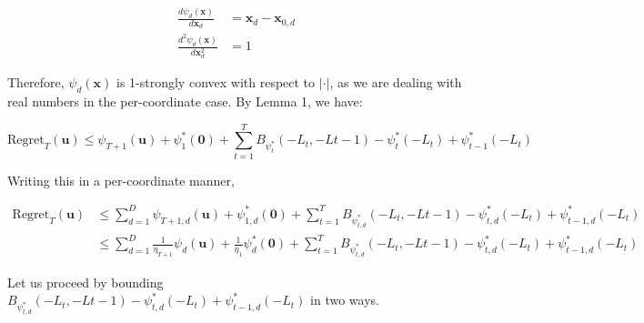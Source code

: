 \documentclass{article}
\newcommand{\Regret}{\text{Regret}}
\newcommand{\bx}{\mathbf{x}}
\newcommand{\bu}{\mathbf{u}}
\begin{document}
\begin{align*}
  \frac{d \psi_d(\bx)}{d \bx_d} &= \bx_d - \bx_{0,d} \\
  \frac{d^2 \psi_d(\bx)}{d \bx_d^2} &= 1
\end{align*}

Therefore, $\psi_d(\bx)$ is 1-strongly convex with respect to $| \cdot |$, as we are dealing with real numbers in the
per-coordinate case. By Lemma 1, we have:

\[
  \Regret_T(\bu) \leq \psi_{T+1}(\bu) + \psi_{1}^* (\textbf{0}) + \sum\limits_{t=1}^T B_{\psi_{t}^*}(-L_t,
  -L{t-1}) - \psi_{t}^* (-L_t) + \psi_{t-1}^*(-L_t)
\]

Writing this in a per-coordinate manner,

\begin{align*}
  \Regret_T(\bu) 
  &\leq \sum\limits_{d=1}^D \psi_{T+1,d}(\bu) + \psi_{1,d}^* (\textbf{0}) + \sum\limits_{t=1}^T
  B_{\psi_{t,d}^*}(-L_t, -L{t-1}) - \psi_{t,d}^* (-L_t) + \psi_{t-1,d}^*(-L_t) \\
  &\leq \sum\limits_{d=1}^D \frac{1}{\eta_{T+1}}\psi_{d}(\bu) + \frac{1}{\eta_1}\psi_{d}^* (\textbf{0}) + \sum\limits_{t=1}^T
  B_{\psi_{t,d}^*}(-L_t, -L{t-1}) - \psi_{t,d}^* (-L_t) + \psi_{t-1,d}^*(-L_t)
\end{align*}

Let us proceed by bounding $B_{\psi_{t,d}^*}(-L_t, -L{t-1}) - \psi_{t,d}^* (-L_t) + \psi_{t-1,d}^*(-L_t)$ in
two ways.
\end{document}
